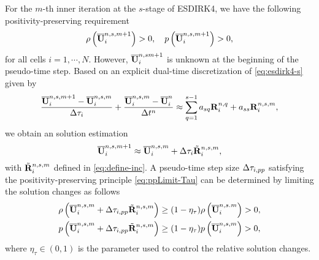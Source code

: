 For the $m$-th inner iteration at the $s$-stage of ESDIRK4, we have the following positivity-preserving requirement
\begin{equation}
    \label{eq:ppLimit-Tau}
    \rho\left(\overline{\mathbf{U}}_i^{n,s,m+1} \right)>0, \quad
    p\left(\overline{\mathbf{U}}_i^{n,s,m+1}\right)>0,
\end{equation}
for all cells $i=1,\cdots,N$. However, $\overline{\mathbf{U}}^{n,sm+1}_i$ is unknown at the beginning of the pseudo-time step. Based on an explicit dual-time  discretization of \eqref{eq:esdirk4-s} given by
\begin{equation}
    \dfrac{\overline{\mathbf{U}}^{n,s,m+1}_i-\overline{\mathbf{U}}^{n,s,m}_i}{\mathrm\Delta \tau_i} + \dfrac{\overline{\mathbf{U}}^{n,s,m}_i - \overline{\mathbf{U}}^{n}_i}{\mathrm\Delta t^n} \approx \sum_{q=1}^{s-1} a_{sq} \mathbf{R}^{n,q}_i + a_{ss} \mathbf{R}_i^{n,s,m},
\end{equation}
we obtain an solution estimation
\begin{equation}
    \label{eq:estimation-dtau}
    \overline{\mathbf{U}}_i^{n,s,m+1} \approx  \overline{\mathbf{U}}_i^{n,s,m} + \mathrm\Delta \tau_i  \tilde{\mathbf{R}}_i^{n,s,m},
\end{equation}
with $ \tilde{\mathbf{R}}_i^{n,s,m}$ defined in \eqref{eq:define-inc}.
A pseudo-time step size $ \mathrm\Delta \tau_{i,pp}$ satisfying the positivity-preserving principle \eqref{eq:ppLimit-Tau} can be determined by limiting the solution changes as follows
\begin{equation}
    \label{eq:ppLimitDtau}
    \begin{aligned}
        \rho\left(\overline{\mathbf{U}}_i^{n,s,m} +  \mathrm\Delta \tau_{i,pp} \tilde{\mathbf{R}}_i^{n,s,m}\right)
         & \geq
        (1- \eta_\tau)
        \rho\left(\overline{\mathbf{U}}_i^{n,s.m}\right)>0, \\
        p\left(\overline{\mathbf{U}}_i^{n,s,m} + \mathrm\Delta  \tau_{i,pp} \tilde{\mathbf{R}}_i^{n,s,m}\right)
         & \geq
        (1- \eta_\tau)
        p\left(\overline{\mathbf{U}}_i^{n,s,m}\right)>0,
    \end{aligned}
\end{equation}
where $\eta_\tau\in(0,1)$ is the parameter used to control the relative solution changes.

